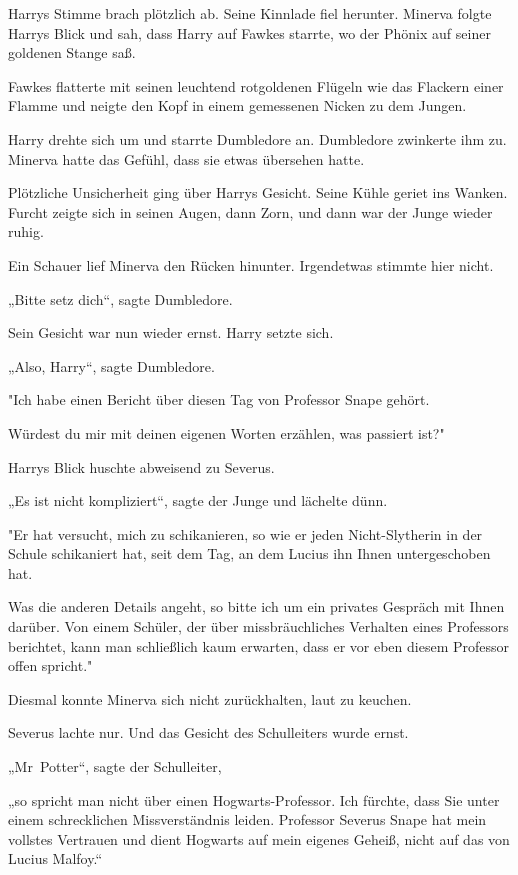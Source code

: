 {Harrys Stimme brach plötzlich ab. Seine Kinnlade fiel herunter. Minerva folgte Harrys Blick und sah, dass Harry auf Fawkes starrte, wo der Phönix auf seiner goldenen Stange saß.

Fawkes flatterte mit seinen leuchtend rotgoldenen Flügeln wie das Flackern einer Flamme und neigte den Kopf in einem gemessenen Nicken zu dem Jungen.

Harry drehte sich um und starrte Dumbledore an. Dumbledore zwinkerte ihm zu. Minerva hatte das Gefühl, dass sie etwas übersehen hatte.

Plötzliche Unsicherheit ging über Harrys Gesicht. Seine Kühle geriet ins Wanken. Furcht zeigte sich in seinen Augen, dann Zorn, und dann war der Junge wieder ruhig.

Ein Schauer lief Minerva den Rücken hinunter. Irgendetwas stimmte hier nicht.

„Bitte setz dich“, sagte Dumbledore.

Sein Gesicht war nun wieder ernst. Harry setzte sich.

„Also, Harry“, sagte Dumbledore.

"Ich habe einen Bericht über diesen Tag von Professor Snape gehört.

Würdest du mir mit deinen eigenen Worten erzählen, was passiert ist?"

Harrys Blick huschte abweisend zu Severus.

„Es ist nicht kompliziert“, sagte der Junge und lächelte dünn.

"Er hat versucht, mich zu schikanieren, so wie er jeden Nicht-Slytherin in der Schule schikaniert hat, seit dem Tag, an dem Lucius ihn Ihnen untergeschoben hat.

Was die anderen Details angeht, so bitte ich um ein privates Gespräch mit Ihnen darüber. Von einem Schüler, der über missbräuchliches Verhalten eines Professors berichtet, kann man schließlich kaum erwarten, dass er vor eben diesem Professor offen spricht."

Diesmal konnte Minerva sich nicht zurückhalten, laut zu keuchen.

Severus lachte nur. Und das Gesicht des Schulleiters wurde ernst.

„Mr~Potter“, sagte der Schulleiter,

„so spricht man nicht über einen Hogwarts-Professor. Ich fürchte, dass Sie unter einem schrecklichen Missverständnis leiden. Professor Severus Snape hat mein vollstes Vertrauen und dient Hogwarts auf mein eigenes Geheiß, nicht auf das von Lucius Malfoy.“

}
